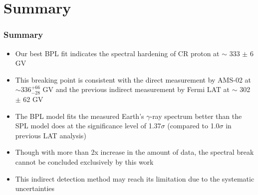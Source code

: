 \documentclass{beamer}
\begin{document}
\section{Summary}
\begin{frame}
\frametitle{Summary}
\begin{itemize}
  \item Our best BPL fit indicates the spectral hardening of
  CR proton at $\sim$ 333 $\pm$ 6 GV
  \item This breaking point is consistent with the direct measurement
  by AMS-02 at $\sim 336^{+66}_{-28}$ GV and the previous indirect measurement
  by Fermi LAT at $\sim$ 302 $\pm$ 62 GV
  \item The BPL model fits the measured Earth's $\gamma$-ray
  spectrum better than the SPL model does at the significance
  level of 1.37$\sigma$ (compared to 1.0$\sigma$ in previous
  LAT analysis)
  \item Though with more than 2x increase in the amount of data,
  the spectral break cannot be concluded exclusively by this work
  \item This indirect detection method may reach its limitation
  due to the systematic uncertainties
\end{itemize}

\end{frame}




\appendix
\end{document}
